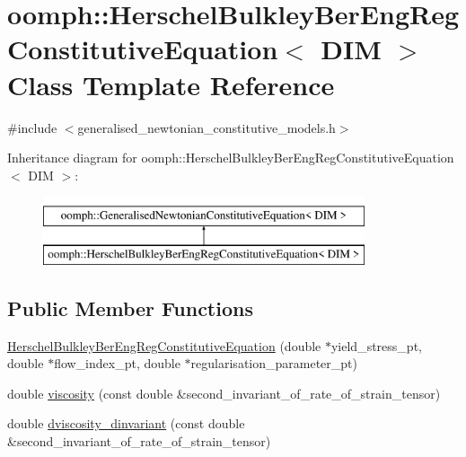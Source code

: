 \hypertarget{classoomph_1_1HerschelBulkleyBerEngRegConstitutiveEquation}{}\section{oomph\+:\+:Herschel\+Bulkley\+Ber\+Eng\+Reg\+Constitutive\+Equation$<$ D\+IM $>$ Class Template Reference}
\label{classoomph_1_1HerschelBulkleyBerEngRegConstitutiveEquation}


{\ttfamily \#include $<$generalised\+\_\+newtonian\+\_\+constitutive\+\_\+models.\+h$>$}

Inheritance diagram for oomph\+:\+:Herschel\+Bulkley\+Ber\+Eng\+Reg\+Constitutive\+Equation$<$ D\+IM $>$\+:\begin{figure}[H]
\begin{center}
\leavevmode
\includegraphics[height=2.000000cm]{classoomph_1_1HerschelBulkleyBerEngRegConstitutiveEquation}
\end{center}
\end{figure}
\subsection*{Public Member Functions}
\begin{DoxyCompactItemize}
\item 
\hyperlink{classoomph_1_1HerschelBulkleyBerEngRegConstitutiveEquation_a35b80c3dca1702270e8346a63689adf5}{Herschel\+Bulkley\+Ber\+Eng\+Reg\+Constitutive\+Equation} (double $\ast$yield\+\_\+stress\+\_\+pt, double $\ast$flow\+\_\+index\+\_\+pt, double $\ast$regularisation\+\_\+parameter\+\_\+pt)
\item 
double \hyperlink{classoomph_1_1HerschelBulkleyBerEngRegConstitutiveEquation_aa56ae7a2ef80789048d81925d9c9e9db}{viscosity} (const double \&second\+\_\+invariant\+\_\+of\+\_\+rate\+\_\+of\+\_\+strain\+\_\+tensor)
\item 
double \hyperlink{classoomph_1_1HerschelBulkleyBerEngRegConstitutiveEquation_ac02f227a7ca7fcd65fe0f9c0baff417d}{dviscosity\+\_\+dinvariant} (const double \&second\+\_\+invariant\+\_\+of\+\_\+rate\+\_\+of\+\_\+strain\+\_\+tensor)
\end{DoxyCompactItemize}
